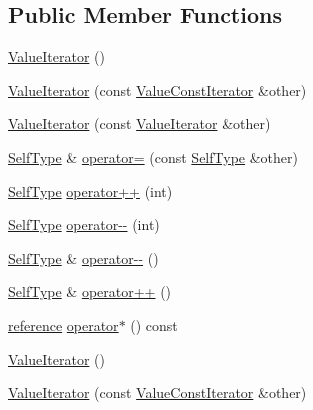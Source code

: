 \subsection*{Public Member Functions}
\begin{DoxyCompactItemize}
\item 
\hyperlink{classJson_1_1ValueIterator_a09425cf4dc12244072a942f290a5c0ec}{Value\-Iterator} ()
\item 
\hyperlink{classJson_1_1ValueIterator_aa85aa208670891670392259efa0143bb}{Value\-Iterator} (const \hyperlink{classJson_1_1ValueConstIterator}{Value\-Const\-Iterator} \&other)
\item 
\hyperlink{classJson_1_1ValueIterator_a7d5e58a9a4a553968acdf3064b39d21c}{Value\-Iterator} (const \hyperlink{classJson_1_1ValueIterator}{Value\-Iterator} \&other)
\item 
\hyperlink{classJson_1_1ValueIteratorBase_a9d2a940d03ea06d20d972f41a89149ee}{Self\-Type} \& \hyperlink{classJson_1_1ValueIterator_a263912ab48a278202312cfddf636bc71}{operator=} (const \hyperlink{classJson_1_1ValueIteratorBase_a9d2a940d03ea06d20d972f41a89149ee}{Self\-Type} \&other)
\item 
\hyperlink{classJson_1_1ValueIteratorBase_a9d2a940d03ea06d20d972f41a89149ee}{Self\-Type} \hyperlink{classJson_1_1ValueIterator_abcf4ddd994a010742cd4a436d65acd08}{operator++} (int)
\item 
\hyperlink{classJson_1_1ValueIteratorBase_a9d2a940d03ea06d20d972f41a89149ee}{Self\-Type} \hyperlink{classJson_1_1ValueIterator_a06d6a29d96caf6af324a53973159e12b}{operator-\/-\/} (int)
\item 
\hyperlink{classJson_1_1ValueIteratorBase_a9d2a940d03ea06d20d972f41a89149ee}{Self\-Type} \& \hyperlink{classJson_1_1ValueIterator_a811302a868518a0995a9def955df5720}{operator-\/-\/} ()
\item 
\hyperlink{classJson_1_1ValueIteratorBase_a9d2a940d03ea06d20d972f41a89149ee}{Self\-Type} \& \hyperlink{classJson_1_1ValueIterator_a92146c46f8249e2b2d12869e70cd4cee}{operator++} ()
\item 
\hyperlink{classJson_1_1ValueIterator_ae87929b4567aa00372cf602c43b57160}{reference} \hyperlink{classJson_1_1ValueIterator_aaa5be3457eedf0526a03b8a3b4c7c0a0}{operator$\ast$} () const 
\item 
\hyperlink{classJson_1_1ValueIterator_a09425cf4dc12244072a942f290a5c0ec}{Value\-Iterator} ()
\item 
\hyperlink{classJson_1_1ValueIterator_aa85aa208670891670392259efa0143bb}{Value\-Iterator} (const \hyperlink{classJson_1_1ValueConstIterator}{Value\-Const\-Iterator} \&other)

\end{DoxyCompactItemize}
